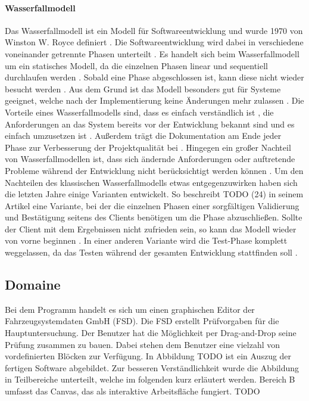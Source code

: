 \documentclass{article}
\begin{document}
    \paragraph{Wasserfallmodell}
    Das Wasserfallmodell ist ein Modell für Softwareentwicklung \cite{24} und wurde 1970 von Winston W. Royce definiert \cite{25}. 
    Die Softwareentwicklung wird dabei in verschiedene voneinander getrennte Phasen unterteilt \cite{22}.
    Es handelt sich beim Wasserfallmodell um ein statisches Modell, da die einzelnen Phasen linear und sequentiell durchlaufen werden \cite{22}.
    Sobald eine Phase abgeschlossen ist, kann diese nicht wieder besucht werden \cite{22}. 
    Aus dem Grund ist das Modell besonders gut für Systeme geeignet, welche nach der Implementierung keine Änderungen mehr zulassen \cite{22}. 
    Die Vorteile eines Wasserfallmodells sind, dass es einfach verständlich ist \cite{22}, die Anforderungen an das System bereits vor der Entwicklung bekannt sind und es einfach umzusetzen ist \cite{23}.
    Außerdem trägt die Dokumentation am Ende jeder Phase zur Verbesserung der Projektqualität bei \cite{23}.
    Hingegen ein großer Nachteil von Wasserfallmodellen ist, dass sich ändernde Anforderungen oder auftretende Probleme während der Entwicklung nicht berücksichtigt werden können \cite{23}.
    Um den Nachteilen des klassischen Wasserfallmodells etwas entgegenzuwirken haben sich die letzten Jahre einige Varianten entwickelt.
    So beschreibt TODO (24) in seinem Artikel eine Variante, bei der die einzelnen Phasen einer sorgfältigen Validierung und Bestätigung seitens des Clients benötigen um die Phase abzuschließen. 
    Sollte der Client mit dem Ergebnissen nicht zufrieden sein, so kann das Modell wieder von vorne beginnen \cite{24}. 
    In einer anderen Variante wird die Test-Phase komplett weggelassen, da das Testen während der gesamten Entwicklung stattfinden soll \cite{25}.
    \subsection{Domaine}
    Bei dem Programm handelt es sich um einen graphischen Editor der Fahrzeugsystemdaten GmbH (FSD).
    Die FSD erstellt Prüfvorgaben für die Hauptuntersuchung.
    Der Benutzer hat die Möglichkeit per Drag-and-Drop seine Prüfung zusammen zu bauen.
    Dabei stehen dem Benutzer eine vielzahl von vordefinierten Blöcken zur Verfügung.
    In Abbildung TODO ist ein Auszug der fertigen Software abgebildet.
    Zur besseren Verständlichkeit wurde die Abbildung in Teilbereiche unterteilt, welche im folgenden kurz erläutert werden.
    Bereich B umfasst das Canvas, das als interaktive Arbeitsfläche fungiert.
    TODO
    \newpage
\end{document}
